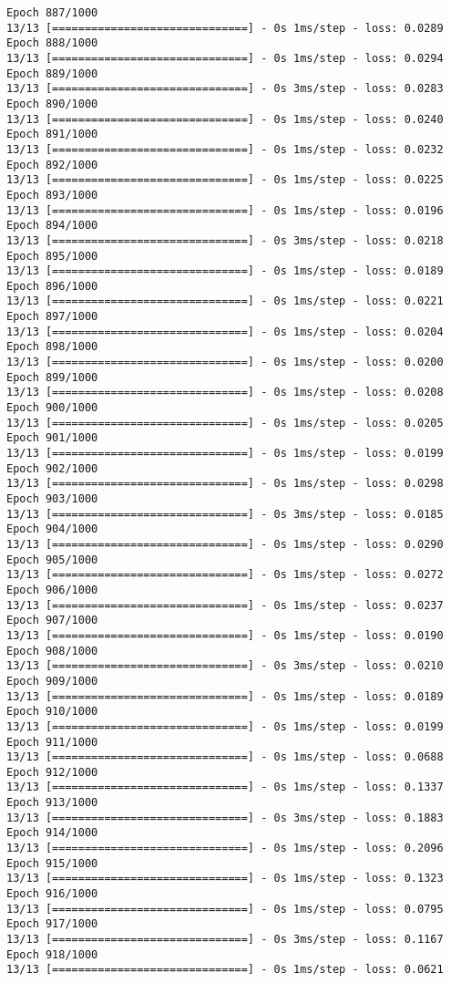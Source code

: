 \documentclass[11pt]{article}
\begin{document}
\begin{Verbatim}[commandchars=\\\{\}]
Epoch 887/1000
13/13 [==============================] - 0s 1ms/step - loss: 0.0289
Epoch 888/1000
13/13 [==============================] - 0s 1ms/step - loss: 0.0294
Epoch 889/1000
13/13 [==============================] - 0s 3ms/step - loss: 0.0283
Epoch 890/1000
13/13 [==============================] - 0s 1ms/step - loss: 0.0240
Epoch 891/1000
13/13 [==============================] - 0s 1ms/step - loss: 0.0232
Epoch 892/1000
13/13 [==============================] - 0s 1ms/step - loss: 0.0225
Epoch 893/1000
13/13 [==============================] - 0s 1ms/step - loss: 0.0196
Epoch 894/1000
13/13 [==============================] - 0s 3ms/step - loss: 0.0218
Epoch 895/1000
13/13 [==============================] - 0s 1ms/step - loss: 0.0189
Epoch 896/1000
13/13 [==============================] - 0s 1ms/step - loss: 0.0221
Epoch 897/1000
13/13 [==============================] - 0s 1ms/step - loss: 0.0204
Epoch 898/1000
13/13 [==============================] - 0s 1ms/step - loss: 0.0200
Epoch 899/1000
13/13 [==============================] - 0s 1ms/step - loss: 0.0208
Epoch 900/1000
13/13 [==============================] - 0s 1ms/step - loss: 0.0205
Epoch 901/1000
13/13 [==============================] - 0s 1ms/step - loss: 0.0199
Epoch 902/1000
13/13 [==============================] - 0s 1ms/step - loss: 0.0298
Epoch 903/1000
13/13 [==============================] - 0s 3ms/step - loss: 0.0185
Epoch 904/1000
13/13 [==============================] - 0s 1ms/step - loss: 0.0290
Epoch 905/1000
13/13 [==============================] - 0s 1ms/step - loss: 0.0272
Epoch 906/1000
13/13 [==============================] - 0s 1ms/step - loss: 0.0237
Epoch 907/1000
13/13 [==============================] - 0s 1ms/step - loss: 0.0190
Epoch 908/1000
13/13 [==============================] - 0s 3ms/step - loss: 0.0210
Epoch 909/1000
13/13 [==============================] - 0s 1ms/step - loss: 0.0189
Epoch 910/1000
13/13 [==============================] - 0s 1ms/step - loss: 0.0199
Epoch 911/1000
13/13 [==============================] - 0s 1ms/step - loss: 0.0688
Epoch 912/1000
13/13 [==============================] - 0s 1ms/step - loss: 0.1337
Epoch 913/1000
13/13 [==============================] - 0s 3ms/step - loss: 0.1883
Epoch 914/1000
13/13 [==============================] - 0s 1ms/step - loss: 0.2096
Epoch 915/1000
13/13 [==============================] - 0s 1ms/step - loss: 0.1323
Epoch 916/1000
13/13 [==============================] - 0s 1ms/step - loss: 0.0795
Epoch 917/1000
13/13 [==============================] - 0s 3ms/step - loss: 0.1167
Epoch 918/1000
13/13 [==============================] - 0s 1ms/step - loss: 0.0621

\end{Verbatim}
\end{document}
